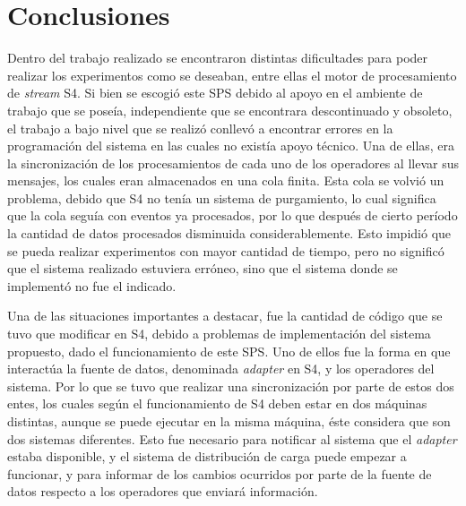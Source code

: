 \chapter{Conclusiones}
\label{cap:conclusiones}

Dentro del trabajo realizado se encontraron distintas dificultades para poder realizar los experimentos como se deseaban, entre ellas el motor de procesamiento de \textit{stream} S4. Si bien se escogió este SPS debido al apoyo en el ambiente de trabajo que se poseía, independiente que se encontrara descontinuado y obsoleto, el trabajo a bajo nivel que se realizó conllevó a encontrar errores en la programación del sistema en las cuales no existía apoyo técnico. Una de ellas, era la sincronización de los procesamientos de cada uno de los operadores al llevar sus mensajes, los cuales eran almacenados en una cola finita. Esta cola se volvió un problema, debido que S4 no tenía un sistema de purgamiento, lo cual significa que la cola seguía con eventos ya procesados, por lo que después de cierto período la cantidad de datos procesados disminuida considerablemente. Esto impidió que se pueda realizar experimentos con mayor cantidad de tiempo, pero no significó que el sistema realizado estuviera erróneo, sino que el sistema donde se implementó no fue el indicado.

Una de las situaciones importantes a destacar, fue la cantidad de código que se tuvo que modificar en S4, debido a problemas de implementación del sistema propuesto, dado el funcionamiento de este SPS. Uno de ellos fue la forma en que interactúa la fuente de datos, denominada \textit{adapter} en S4, y los operadores del sistema. Por lo que se tuvo que realizar una sincronización por parte de estos dos entes, los cuales según el funcionamiento de S4 deben estar en dos máquinas distintas, aunque se puede ejecutar en la misma máquina, éste considera que son dos sistemas diferentes. Esto fue necesario para notificar al sistema que el \textit{adapter} estaba disponible, y el sistema de distribución de carga puede empezar a funcionar, y para informar de los cambios ocurridos por parte de la fuente de datos respecto a los operadores que enviará información.

